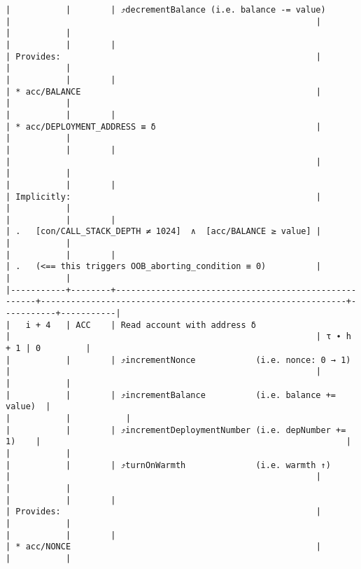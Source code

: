 \documentclass[varwidth=\maxdimen,margin=0.5cm,multi={verbatim}]{standalone}
\begin{document}
\begin{verbatim}
|           |        | ⤴️decrementBalance (i.e. balance -= value)           |                                                             |           |           |
|           |        |                                                      | Provides:                                                   |           |           |
|           |        |                                                      | * acc/BALANCE                                               |           |           |
|           |        |                                                      | * acc/DEPLOYMENT_ADDRESS ≡ δ                                |           |           |
|           |        |                                                      |                                                             |           |           |
|           |        |                                                      | Implicitly:                                                 |           |           |
|           |        |                                                      | .   [con/CALL_STACK_DEPTH ≠ 1024]  ∧  [acc/BALANCE ≥ value] |           |           |
|           |        |                                                      | .   (<== this triggers OOB_aborting_condition ≡ 0)          |           |           |
|-----------+--------+------------------------------------------------------+-------------------------------------------------------------+-----------+-----------|
|   i + 4   | ACC    | Read account with address δ                          |                                                             | τ ∙ h + 1 | 0         |
|           |        | ⤴️incrementNonce            (i.e. nonce: 0 → 1)      |                                                             |           |           |
|           |        | ⤴️incrementBalance          (i.e. balance += value)  |                                                             |           |           |
|           |        | ⤴️incrementDeploymentNumber (i.e. depNumber += 1)    |                                                             |           |           |
|           |        | ⤴️turnOnWarmth              (i.e. warmth ↑)          |                                                             |           |           |
|           |        |                                                      | Provides:                                                   |           |           |
|           |        |                                                      | * acc/NONCE                                                 |           |           |

\end{verbatim}
\end{document}
